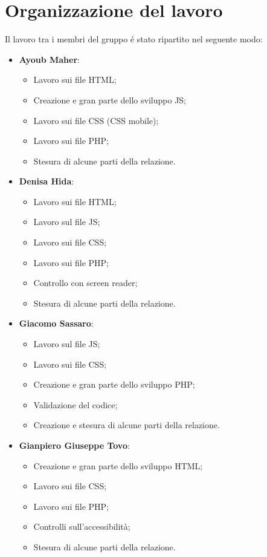 \section{Organizzazione del lavoro}
Il lavoro tra i membri del gruppo é stato ripartito nel seguente modo:
\begin{itemize}
	\item \textbf{Ayoub Maher}:
	\begin{itemize}
		\item Lavoro sui file HTML;
		\item Creazione e gran parte dello sviluppo JS;
		\item Lavoro sui file CSS (CSS mobile);
		\item Lavoro sui file PHP;
		\item Stesura di alcune parti della relazione.
	\end{itemize}
	
	\item \textbf{Denisa Hida}:
	\begin{itemize}
		\item Lavoro sui file HTML;
		\item Lavoro sul file JS;
		\item Lavoro sui file CSS;
		\item Lavoro sui file PHP;
		\item Controllo con screen reader;
		\item Stesura di alcune parti della relazione.
	\end{itemize}
	
	\item \textbf{Giacomo Sassaro}:
	\begin{itemize}
		\item Lavoro sul file JS;
		\item Lavoro sui file CSS;
		\item Creazione e gran parte dello sviluppo PHP;
		\item Validazione del codice;
		\item Creazione e stesura di alcune parti della relazione.
	\end{itemize}
	
	\item \textbf{Gianpiero Giuseppe Tovo}:
	\begin{itemize}
		\item Creazione e gran parte dello sviluppo HTML;
		\item Lavoro sui file CSS;
		\item Lavoro sui file PHP;
		\item Controlli sull'accessibilità;
		\item Stesura di alcune parti della relazione.
	\end{itemize}
	
\end{itemize}
